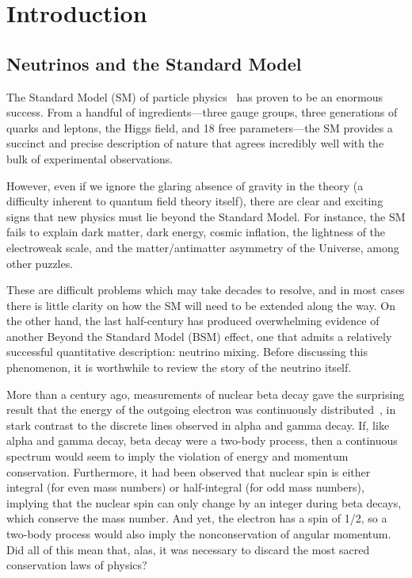 \documentclass[../thesis.tex]{subfiles}
\begin{document}
\chapter{Introduction}
\label{chap:intro}

\section{Neutrinos and the Standard Model}
\label{sec:neuAndSM}

The Standard Model (SM) of particle physics~\cite{Rosner_2001zy} has proven to be an enormous success. From a handful of ingredients---three gauge groups, three generations of quarks and leptons, the Higgs field, and 18 free parameters---the SM provides a succinct and precise description of nature that agrees incredibly well with the bulk of experimental observations.

However, even if we ignore the glaring absence of gravity in the theory (a difficulty inherent to quantum field theory itself), there are clear and exciting signs that new physics must lie beyond the Standard Model. For instance, the SM fails to explain dark matter, dark energy, cosmic inflation, the lightness of the electroweak scale, and the matter/antimatter asymmetry of the Universe, among other puzzles.

These are difficult problems which may take decades to resolve, and in most cases there is little clarity on how the SM will need to be extended along the way. On the other hand, the last half-century has produced overwhelming evidence of another Beyond the Standard Model (BSM) effect, one that admits a relatively successful quantitative description: neutrino mixing. Before discussing this phenomenon, it is worthwhile to review the story of the neutrino itself.

More than a century ago, measurements of nuclear beta decay gave the surprising result that the energy of the outgoing electron was continuously distributed~\cite{Chadwick:262756}, in stark contrast to the discrete lines observed in alpha and gamma decay. If, like alpha and gamma decay, beta decay were a two-body process, then a continuous spectrum would seem to imply the violation of energy and momentum conservation. Furthermore, it had been observed that nuclear spin is either integral (for even mass numbers) or half-integral (for odd mass numbers), implying that the nuclear spin can only change by an integer during beta decays, which conserve the mass number. And yet, the electron has a spin of 1/2, so a two-body process would also imply the nonconservation of angular momentum. Did all of this mean that, alas, it was necessary to discard the most sacred conservation laws of physics?
\end{document}
